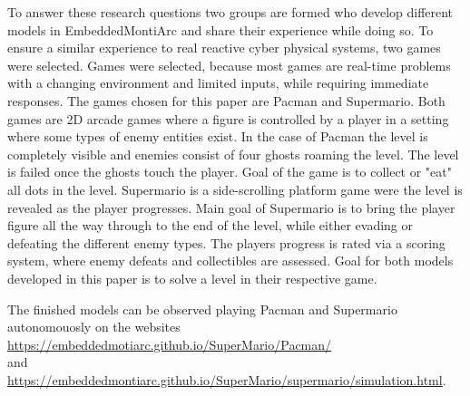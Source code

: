 To answer these research questions two groups are formed who develop different models in EmbeddedMontiArc and share their experience while doing so. To ensure a similar experience to real reactive cyber physical systems, two games were selected.
Games were selected, because most games are real-time problems with a changing environment and limited inputs, while requiring immediate responses.
The games chosen for this paper are Pacman and Supermario.  Both games are 2D arcade games where a figure is controlled by a player in a setting where some types of enemy entities exist. 
In the case of Pacman the level is completely visible and enemies consist of four ghosts roaming the level. The level is failed once the ghosts touch the player. Goal of the game is to collect or "eat" all dots in the level.
Supermario is a side-scrolling platform game were the level is revealed as the player progresses. Main goal of Supermario is to bring the player figure all the way through to the end of the level, while either evading or defeating the different enemy types. The players progress is rated via a scoring system, where enemy defeats and collectibles are assessed.
Goal for both models developed in this paper is to solve a level in their respective game.

The finished models can be observed playing Pacman and Supermario autonomouosly on the websites \\
\url{https://embeddedmotiarc.github.io/SuperMario/Pacman/}\cite{pacmanmodel} \\
and \\
\url{https://embeddedmontiarc.github.io/SuperMario/supermario/simulation.html}\cite{mariomodel}.